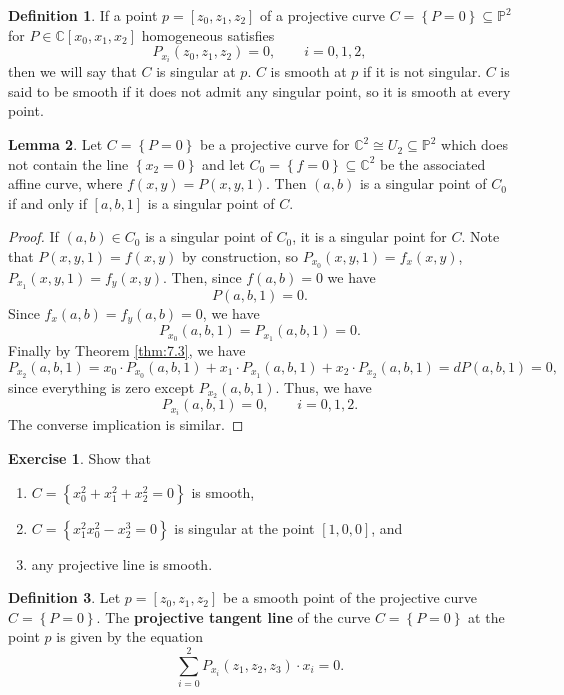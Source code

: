 \documentclass{article}
\newcommand{\C}{\mathbb{C}}
\renewcommand{\P}{\mathbb{P}}
\newcommand{\rb}[1]{\left( #1 \right)}
\renewcommand{\sb}[1]{\left[ #1 \right]}
\newcommand{\cb}[1]{\left\{ #1 \right\}}
\theoremstyle{definition}\newtheorem{definition}{Definition}[section]
\theoremstyle{definition}\newtheorem{notation}[definition]{Notation}
\theoremstyle{definition}\newtheorem{remark}[definition]{Remark}
\theoremstyle{definition}\newtheorem{example}[definition]{Example}
\theoremstyle{definition}\newtheorem{fact}{Fact}
\theoremstyle{definition}\newtheorem{exercise}{Exercise}
\newtheorem{lemma}[definition]{Lemma}
\begin{document}
\begin{definition}
If a point $ p = \sb{z_0, z_1, z_2} $ of a projective curve $ C = \cb{P = 0} \subseteq \P^2 $ for $ P \in \C\sb{x_0, x_1, x_2} $ homogeneous satisfies
$$ P_{x_i}\rb{z_0, z_1, z_2} = 0, \qquad i = 0, 1, 2, $$
then we will say that $ C $ is singular at $ p $. $ C $ is smooth at $ p $ if it is not singular. $ C $ is said to be smooth if it does not admit any singular point, so it is smooth at every point.
\end{definition}

\begin{lemma}
Let $ C = \cb{P = 0} $ be a projective curve for $ \C^2 \cong U_2 \subseteq \P^2 $ which does not contain the line $ \cb{x_2 = 0} $ and let $ C_0 = \cb{f = 0} \subseteq \C^2 $ be the associated affine curve, where $ f\rb{x, y} = P\rb{x, y, 1} $. Then $ \rb{a, b} $ is a singular point of $ C_0 $ if and only if $ \sb{a, b, 1} $ is a singular point of $ C $.
\end{lemma}

\begin{proof}
If $ \rb{a, b} \in C_0 $ is a singular point of $ C_0 $, it is a singular point for $ C $. Note that $ P\rb{x, y, 1} = f\rb{x, y} $ by construction, so $ P_{x_0}\rb{x, y, 1} = f_x\rb{x, y} $, $ P_{x_1}\rb{x, y, 1} = f_y\rb{x, y} $. Then, since $ f\rb{a, b} = 0 $ we have
$$ P\rb{a, b, 1} = 0. $$
Since $ f_x\rb{a, b} = f_y\rb{a, b} = 0 $, we have
$$ P_{x_0}\rb{a, b, 1} = P_{x_1}\rb{a, b, 1} = 0. $$
Finally by Theorem \ref{thm:7.3}, we have
$$ P_{x_2}\rb{a, b, 1} = x_0 \cdot P_{x_0}\rb{a, b, 1} + x_1 \cdot P_{x_1}\rb{a, b, 1} + x_2 \cdot P_{x_2}\rb{a, b, 1} = dP\rb{a, b, 1} = 0, $$
since everything is zero except $ P_{x_2}\rb{a, b, 1} $. Thus, we have
$$ P_{x_i}\rb{a, b, 1} = 0, \qquad i = 0, 1, 2. $$
The converse implication is similar.
\end{proof}

\begin{exercise}
Show that
\begin{enumerate}
\item $ C = \cb{x_0^2 + x_1^2 + x_2^2 = 0} $ is smooth,
\item $ C = \cb{x_1^2x_0^2 - x_2^3 = 0} $ is singular at the point $ \sb{1, 0, 0} $, and
\item any projective line is smooth.
\end{enumerate}
\end{exercise}

\begin{definition}
Let $ p = \sb{z_0, z_1, z_2} $ be a smooth point of the projective curve $ C = \cb{P = 0} $. The \textbf{projective tangent line} of the curve $ C = \cb{P = 0} $ at the point $ p $ is given by the equation
$$ \sum_{i = 0}^2 P_{x_i}\rb{z_1, z_2, z_3} \cdot x_i = 0. $$
\end{definition}
\end{document}
